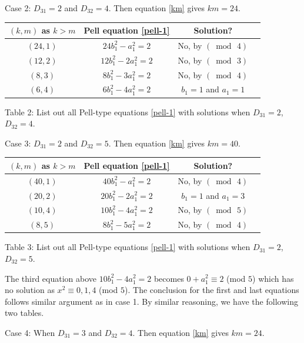 \documentclass[12pt]{article}
\begin{document}
\bigskip

Case 2: $D_{31} = 2$ and $D_{32} = 4$. Then equation \eqref{km} gives $k m = 24$.

\begin{center}
\begin{tabular}{|c|c|c|c|}
\hline $(k, m)$ as $k > m$ & Pell equation \eqref{pell-1} & Solution? \\
\hline $(24,1)$ & $24b_1^2-a_1^2=2$ & No, by $(\bmod \, 4)$\\
\hline $(12,2)$ & $12b_1^2-2a_1^2=2$ & No, by $(\bmod \, 3)$\\
\hline $(8,3)$ & $8b_1^2-3a_1^2=2$ & No, by $(\bmod \, 4)$\\
\hline $(6,4)$ & $6b_1^2-4a_1^2=2$ & $b_1=1$ and $a_1=1$\\
\hline
\end{tabular}
\newline \small{Table 2: List out all Pell-type equations \eqref{pell-1} with solutions when $D_{31} = 2$, $D_{32} = 4$.}
\end{center}

Case 3: $D_{31} = 2$ and $D_{32} = 5$. Then equation \eqref{km} gives $k m = 40$.

\begin{center}
\begin{tabular}{|c|c|c|c|}
\hline $(k, m)$ as $k > m$ & Pell equation \eqref{pell-1} & Solution? \\
\hline $(40,1)$ & $40b_1^2-a_1^2=2$ & No, by $(\bmod \, 4)$\\
\hline $(20,2)$ & $20b_1^2-2a_1^2=2$ & $b_1=1$ and $a_1=3$\\
\hline $(10,4)$ & $10b_1^2-4a_1^2=2$ & No, by $(\bmod \, 5)$\\
\hline $(8,5)$ & $8b_1^2-5a_1^2=2$ & No, by $(\bmod \, 4)$\\
\hline
\end{tabular}
\newline \small{Table 3: List out all Pell-type equations \eqref{pell-1} with solutions when $D_{31} = 2$, $D_{32} = 5$.}
\end{center}

\noindent The third equation above $10b_1^2-4a_1^2 = 2$ becomes $0 + a_1^2 \equiv 2$ (mod $5$) which has no solution as $x^2 \equiv 0, 1, 4$ (mod $5$). The conclusion for the first and last equations follows similar argument as in case 1. By similar reasoning, we have the following two tables.

\bigskip

Case 4: When $D_{31} = 3$ and $D_{32} = 4$. Then equation \eqref{km} gives $k m = 24$.
\end{document}
